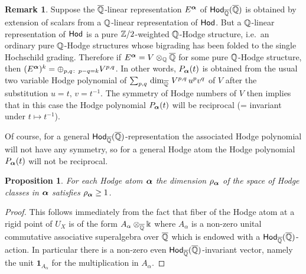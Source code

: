 \documentclass[twoside,leqno]{article}
\numberwithin{equation}{section}
\theoremstyle{plain}
\newtheorem{proposition}[equation]{Proposition}
\theoremstyle{definition}
\newtheorem{remark}[equation]{Remark}
\begin{document}
\begin{remark} \label{rem:weight}
Suppose the $\overline{\mathbb Q}$-linear representation $E^{\boldsymbol{\alpha}}$ of $\mathsf{Hod}_{\overline{\mathbb Q}}(\overline{\mathbb Q})$ is obtained by extension of scalars from a $\mathbb Q$-linear representation of $\mathsf{Hod}$.  But a $\mathbb Q$-linear representation of $\mathsf{Hod}$ is a pure $\mathbb Z/2$-weighted $\mathbb Q$-Hodge structure, i.e.\  an ordinary pure  $\mathbb Q$-Hodge structures whose bigrading has been folded to the single Hochschild  grading.  
Therefore if $E^{\boldsymbol{\alpha}} = V\otimes_{\mathbb Q} \overline{\mathbb Q}$ for 
some pure $\mathbb Q$-Hodge structure, then $(E^{\boldsymbol{\alpha}})^{k} = \oplus_{p,q\colon \, p-q = k} V^{p,q}$. 
In other words, $P_{\boldsymbol{\alpha}}(t)$ is obtained from the usual two variable  Hodge polynomial of $\sum_{p,q} \, \dim_{\overline{\mathbb Q}} \, V^{p,q} \, u^{p}v^{q}$ of $V$ after the substitution $u = t, \, v = t^{-1}$.
The symmetry of Hodge numbers of $V$ then implies that in this case the Hodge polynomial $P_{\boldsymbol{\alpha}}(t)$ will be reciprocal (= invariant under $t \mapsto t^{-1}$). 

Of course,  for a general $\mathsf{Hod}_{\overline{\mathbb Q}}(\overline{\mathbb Q})$-representation the associated  Hodge polynomial will not have any symmetry, so for a general Hodge atom the Hodge polynomial $P_{\boldsymbol{\alpha}}(t)$ will not be reciprocal.
\end{remark}

\begin{proposition} \label{prop:Ginv1}
    For each Hodge atom $\boldsymbol{\alpha}$  the dimension $\rho_{\boldsymbol{\alpha}}$  of the space of Hodge classes in $\boldsymbol{\alpha}$ satisfies  $\rho_{\boldsymbol{\alpha}} \ge 1$.
\end{proposition}
\begin{proof}
    This follows immediately from the fact that fiber of the Hodge atom at a rigid point of $U_{X}$ is of the form $A_{\alpha}\otimes_{\overline{\mathbb Q}} \Bbbk$ where 
    $A_{\alpha}$ is a non-zero unital commutative associative superalgebra over $\overline{\mathbb Q}$ which is 
    endowed with a $\mathsf{Hod}_{\overline{\mathbb Q}}(\overline{\mathbb Q})$-action. In particular there is  a non-zero even $\mathsf{Hod}_{\overline{\mathbb Q}}(\overline{\mathbb Q})$-invariant vector, namely the unit $\mathbf{1}_{A_{\alpha}}$ for the multiplication  in $A_{\alpha}$. 
\end{proof}
\end{document}
